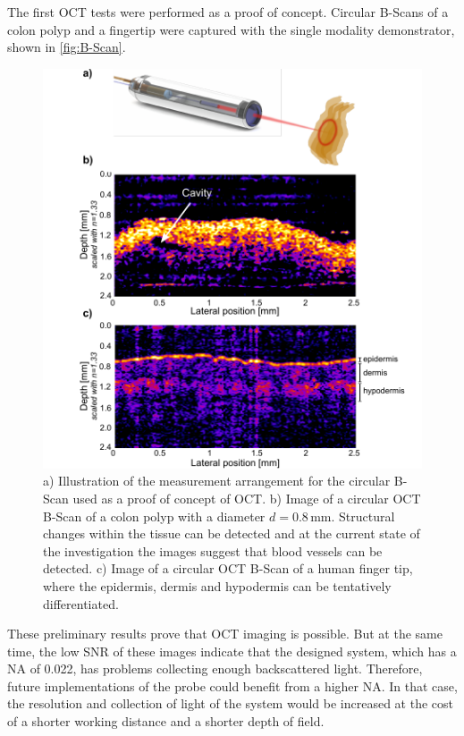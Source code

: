 \documentclass[10pt]{iopart}
\begin{document}
The first OCT tests were performed as a proof of concept. Circular B-Scans of a colon polyp and a fingertip were captured with the single modality demonstrator, shown in \autoref{fig:B-Scan}. 
\begin{figure}[h!]\centering \includegraphics[width=\columnwidth]{figures/OCT_Measurement_arrangement}
      \caption{a) Illustration of the measurement arrangement for the circular B-Scan used as a proof of concept of OCT. b) Image of a circular OCT B-Scan of a colon polyp with a diameter $d=0.8\,\text{mm}$. Structural changes within the tissue can be detected and at the current state of the investigation the images suggest that blood vessels can be detected.
      c) Image of a circular OCT B-Scan of a human finger tip, where the epidermis, dermis and hypodermis can be tentatively differentiated.}
      \label{fig:B-Scan}
\end{figure}

These preliminary results prove that OCT imaging is possible. But at the same time, the low SNR of these images indicate that the designed system, which has a NA of 0.022, has problems collecting enough backscattered light. Therefore, future implementations of the probe could benefit from a higher NA. In that case, the resolution and collection of light of the system would be increased at the cost of a shorter working distance and a shorter depth of field. 
\end{document}
